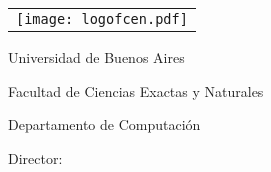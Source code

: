 \newcommand{\HRule}{\rule{\linewidth}{0.2mm}}
%
\thispagestyle{empty}

\begin{center}\leavevmode

\vspace{-2cm}

\begin{tabular}{l}
\texttt{[image: logofcen.pdf]}
\end{tabular}


{\large \sc Universidad de Buenos Aires

Facultad de Ciencias Exactas y Naturales

Departamento de Computaci\'on}

\vspace{6.0cm}


\begin{huge}
\textbf{\tituloTesis}
\end{huge}

\vspace{2cm}

{\Large \autor}

\end{center}

\vfill

{\large

{Director: \director}

\vspace{.2cm}

\lugar
}

\newpage\thispagestyle{empty}
